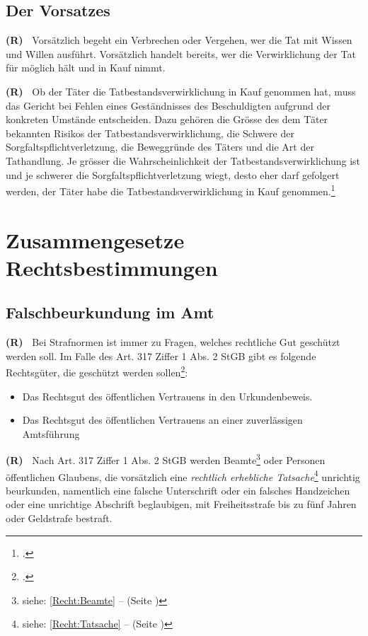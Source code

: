 \documentclass[paper=a4,fontsize=12pt, oneside, numbers=noenddot]{scrbook}
\newcounter{rz}
\newcommand{\Rz}{
	\addtocounter{rz}{1}\textbf{(R\arabic{rz})~}
}
\begin{document}
\subsection{Der Vorsatzes}
\Rz Vorsätzlich begeht ein Verbrechen oder Vergehen, wer die Tat mit Wissen und Willen ausführt. Vorsätzlich handelt bereits, wer die Verwirklichung der Tat für möglich hält und in Kauf nimmt.

\Rz Ob der Täter die Tatbestandsverwirklichung in Kauf genommen hat, muss das Gericht bei Fehlen eines Geständnisses des Beschuldigten aufgrund der konkreten Umstände entscheiden. Dazu gehören die Grösse des dem Täter bekannten Risikos der Tatbestandsverwirklichung, die Schwere der Sorgfaltspflichtverletzung, die Beweggründe des Täters und die Art der Tathandlung. Je grösser die Wahrscheinlichkeit der Tatbestandsverwirklichung ist und je schwerer die Sorgfaltspflichtverletzung wiegt, desto eher darf gefolgert werden, der Täter habe die Tatbestandsverwirklichung in Kauf genommen.\footcite[Erw. 2.2.1.1 d) - (Seite 67)]{KGE46018365}

\section{Zusammengesetze Rechtsbestimmungen}

\subsection{Falschbeurkundung im Amt}
\Rz Bei Strafnormen ist immer zu Fragen, welches rechtliche Gut geschützt werden soll. Im Falle des Art. 317 Ziffer 1 Abs. 2 StGB gibt es folgende Rechtsgüter, die geschützt werden sollen\footcite[Art. 317, Rz. 1]{2020:Wohlers:StGBHandkommentar}:

\begin{itemize}[noitemsep]\setlength\itemsep{0.3em}
\item Das Rechtsgut des öffentlichen Vertrauens in den Urkundenbeweis.
\item Das Rechtsgut des öffentlichen Vertrauens an einer zuverlässigen Amtsführung
\end{itemize} 

\Rz Nach Art. 317 Ziffer 1 Abs. 2 StGB werden Beamte\footnote{siehe: \ref{Recht:Beamte} --  (Seite \pageref{Recht:Beamte})} oder Personen öffentlichen Glaubens, die vorsätzlich eine \textit{rechtlich erhebliche Tatsache}\footnote{siehe: \ref{Recht:Tatsache} --  (Seite \pageref{Recht:Tatsache})} unrichtig beurkunden, namentlich eine falsche Unterschrift oder ein falsches Handzeichen oder eine unrichtige Abschrift beglaubigen, mit Freiheitsstrafe bis zu fünf Jahren oder Geldstrafe bestraft.
\end{document}
